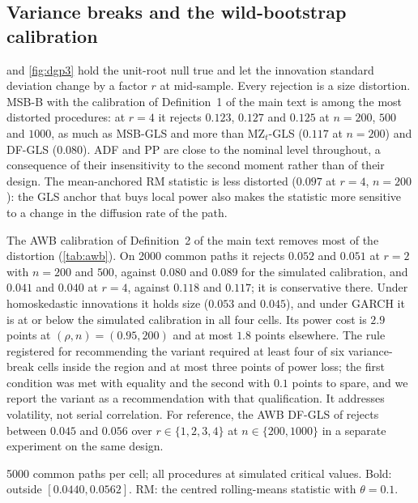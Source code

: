 \documentclass[11pt]{article}
\newcommand{\RMGLS}{MSB-B}
\begin{document}
\subsection*{Variance breaks and the wild-bootstrap calibration}

 and \cref{fig:dgp3} hold the unit-root null true and let
the innovation standard deviation change by a factor $r$ at mid-sample.
Every rejection is a size distortion. \RMGLS{} with the calibration of
Definition~1 of the main text is among the most distorted procedures: at $r = 4$ it
rejects $0.123$, $0.127$ and $0.125$ at $n = 200$, $500$ and $1000$, as
much as MSB-GLS and more than MZ$_t$-GLS ($0.117$ at $n = 200$) and DF-GLS
($0.080$). ADF and PP are close to the nominal level throughout, a
consequence of their insensitivity to the second moment rather than of
their design. The mean-anchored RM statistic is less distorted
($0.097$ at $r = 4$, $n=200$): the GLS anchor that buys local power also
makes the statistic more sensitive to a change in the diffusion rate of
the path.

The AWB calibration of Definition~2 of the main text removes most of the distortion
(\cref{tab:awb}). On 2000 common paths it rejects $0.052$ and $0.051$ at
$r=2$ with $n = 200$ and $500$, against $0.080$ and $0.089$ for the
simulated calibration, and $0.041$ and $0.040$ at $r = 4$, against $0.118$
and $0.117$; it is conservative there. Under homoskedastic innovations it
holds size ($0.053$ and $0.045$), and under GARCH it is at or below the
simulated calibration in all four cells. Its power cost is $2.9$ points at
$(\rho, n) = (0.95, 200)$ and at most $1.8$ points elsewhere. The rule
registered for recommending the variant required at least four of six
variance-break cells inside the region and at most three points of power
loss; the first condition was met with equality and the second with $0.1$
points to spare, and we report the variant as a recommendation with that
qualification. It addresses volatility, not serial correlation. For
reference, the AWB DF-GLS of \citet{cavaliere2008bootstrap} rejects between
$0.045$ and $0.056$ over $r \in \{1, 2, 3, 4\}$ at $n \in\{200, 1000\}$ in a
separate experiment on the same design.

\begin{table}[t]
\centering
\caption{Rejection frequencies under a random walk with a mid-sample
change in innovation standard deviation by a factor $r$; the null is true,
$\alpha = 0.05$.}
\label{tab:dgp3}
\begin{threeparttable}
\small

\begin{tablenotes}\footnotesize
\item 5000 common paths per cell; all procedures at simulated critical
values. Bold: outside $[0.0440, 0.0562]$. RM: the centred rolling-means statistic with $\theta = 0.1$.
\end{tablenotes}
\end{threeparttable}
\end{table}
\end{document}
